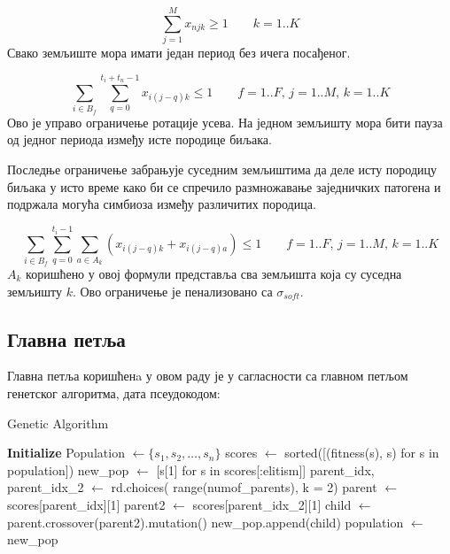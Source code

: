 \documentclass[12pt,fleqn]{article}
\begin{document}
\begin{minipage}{\textwidth}
\begin{equation}
      \sum_{j=1}^M x_{njk} \ge 1 \qquad k = 1..K
\end{equation}
Свако земљиште мора имати један период без ичега посађеног.
\end{minipage}

\begin{minipage}{\textwidth}
  \begin{equation} \label{eq:4}
      \sum_{i\in B_f} \sum_{q=0}^{t_i + t_n-1} x_{i(j-q)k} \le  1 \qquad f=1..F,\, j=1..M,\, k=1..K
    \end{equation}
    Ово је управо ограничење ротације усева. На једном земљишту мора бити пауза од једног периода између исте породице биљака.
  \end{minipage}

  Последње ограничење забрањује суседним земљиштима да деле исту породицу биљака у исто време како би се спречило размножавање заједничких патогена и подржала могућа симбиоза између различитих породица.

  \begin{minipage}{\textwidth}
    \begin{equation}
        \sum_{i\in B_f} \sum_{q=0}^{t_i-1} \sum_{a\in A_k} (x_{i(j-q)k} + x_{i(j-q)a}) \le 1 \qquad f = 1..F,\, j = 1..M,\, k = 1..K
      \end{equation}
      $A_k$ коришћено у овој формули представља сва земљишта која су суседна земљишту $k$. Ово ограничење је пенализовано са $\sigma_{soft}$.
\end{minipage}  
  
\subsection{Главна петља}

\begin{minipage}{\textwidth}
Главна петља коришћенa у овом раду је у сагласности са главном петљом генетског алгоритма, дата псеудокодом:
\begin{algorithm}[H]
\caption{Genetic Algorithm}\label{genetic_algo}
\begin{algorithmic}[1]
\State \textbf{Initialize} Population $\leftarrow \{s_1, s_2, \ldots, s_n\}$
    \State scores $\leftarrow$ sorted([(fitness(s), s) for s in population])
    \State new\_pop $\leftarrow$ [s[1] for s in scores[:elitism]]
        \State parent\_idx, parent\_idx\_2 $\leftarrow$ rd.choices( range(numof\_parents), k = 2)
        \State parent $\leftarrow$ scores[parent\_idx][1]
        \State parent2 $\leftarrow$ scores[parent\_idx\_2][1]
        \State child $\leftarrow$ parent.crossover(parent2).mutation()
        \State new\_pop.append(child)
    \EndFor
    \State population $\leftarrow$ new\_pop
\EndFor
\end{algorithmic}
\end{algorithm}
\end{minipage}
\end{document}
